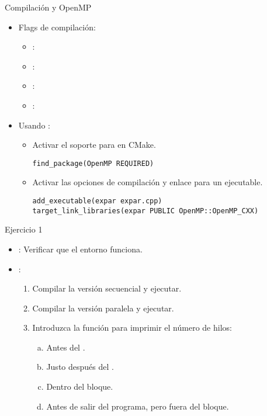 \begin{frame}[t,fragile]{Compilación y OpenMP}

\begin{itemize}
  \item Flags de compilación: 
    \begin{itemize}
      \item {}: 
      \item {}: 
      \item {}: 
      \item {}: 
    \end{itemize}

  \item Usando :
  \begin{itemize}
    \item Activar el soporte para  en CMake.
\begin{lstlisting}
find_package(OpenMP REQUIRED)
\end{lstlisting}

    \item Activar las opciones de compilación y enlace para un ejecutable.
\begin{lstlisting}
add_executable(expar expar.cpp)
target_link_libraries(expar PUBLIC OpenMP::OpenMP_CXX)
\end{lstlisting}
  \end{itemize}
\end{itemize}
\end{frame}

\begin{frame}[t]{Ejercicio 1}
\begin{itemize}
  \item {}: Verificar que el entorno funciona.
  
  \item {}:
  \begin{enumerate}
    \item Compilar la versión secuencial y ejecutar.
    \item Compilar la versión paralela y ejecutar.
    \item Introduzca la función  para
          imprimir el número de hilos:
      \begin{enumerate}[a)]
        \item Antes del .
        \item Justo después del .
        \item Dentro del bloque.
        \item Antes de salir del programa, pero fuera del bloque.
      \end{enumerate}
  \end{enumerate}
\end{itemize}
\end{frame}

